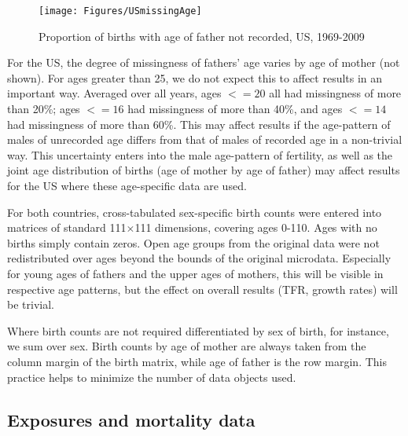 \begin{figure}[ht!]
        \centering  
          \caption{Proportion of births with age of father not recorded, US,
          1969-2009}
           \texttt{[image: Figures/USmissingAge]}
          \label{fig:USmissingAge}
\end{figure}

For the US, the degree of missingness of fathers' age varies by age of
mother (not shown). For ages greater than 25, we do not expect this to affect
results in an important way. Averaged over all years, ages $<= 20$ all had missingness of more than
20\%; ages $<= 16$ had missingness of more than 40\%, and ages $<= 14$ had
missingness of more than 60\%. This may affect results if the age-pattern of
males of unrecorded age differs from that of males of recorded age in a
non-trivial way. This uncertainty enters into the male
age-pattern of fertility, as well as the joint
age distribution of births (age of mother by age of father) may affect results
for the US where these age-specific data are used.

For both countries, cross-tabulated
sex-specific birth counts were entered into matrices of standard 111$\times$111
dimensions, covering ages 0-110. Ages with no births simply contain zeros. Open
age groups from the original data were not redistributed over ages beyond the
bounds of the original microdata. Especially for young ages of fathers and the
upper ages of mothers, this will be visible in respective age
patterns, but the effect on overall results (TFR, growth rates) will be
trivial.

Where birth counts are not required differentiated by sex of birth, for
instance, we sum over sex. Birth counts by age of mother are always taken from
the column margin of the birth matrix, while age of father is the row margin.
This practice helps to minimize the number of data objects used.

\subsection{Exposures and mortality data}


